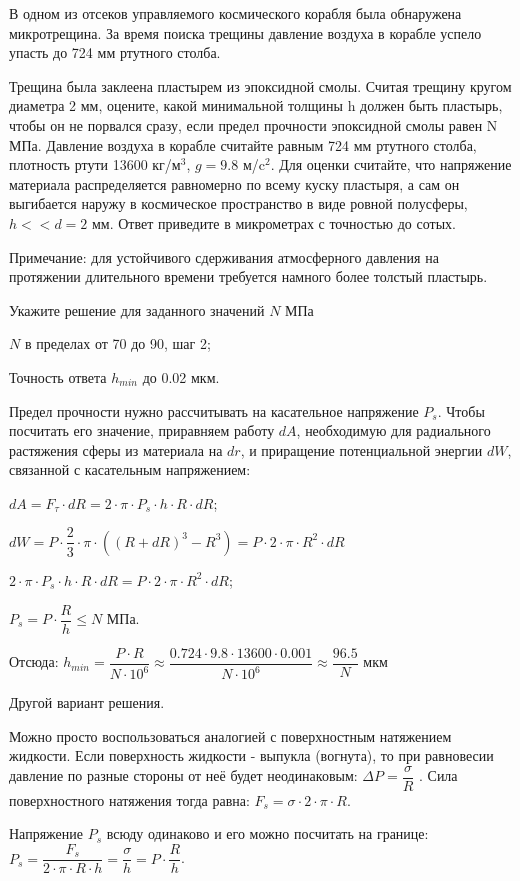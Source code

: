 
В одном из отсеков управляемого космического
корабля была обнаружена микротрещина. За время поиска трещины давление воздуха в
корабле успело упасть до 724 мм ртутного столба. 

Трещина была заклеена
пластырем из эпоксидной смолы. Считая трещину кругом диаметра 2 мм, оцените,
какой минимальной толщины h
должен быть пластырь, чтобы он не порвался сразу, если предел прочности
эпоксидной смолы равен N МПа. Давление воздуха в корабле считайте равным 724 мм ртутного столба, плотность ртути 13600 кг/м$^3$, $g=9.8$ м/c$^2$. Для оценки считайте, что напряжение материала распределяется равномерно по всему
куску пластыря, а сам он выгибается наружу в космическое пространство в виде
ровной полусферы,  $h << d = 2$ мм. Ответ приведите в микрометрах с точностью до сотых.

Примечание:
для устойчивого сдерживания атмосферного давления на протяжении длительного
времени требуется намного более толстый пластырь.

Укажите решение для заданного значений $N$ МПа

\paramSection

$N$ в пределах от 70 до 90, шаг 2;         

Точность ответа  $h_{min}$  до  0.02 мкм.

\solutionSection

Предел прочности нужно рассчитывать на касательное напряжение $P_s$. Чтобы посчитать его значение, 
приравняем работу $dA$, необходимую для радиального растяжения сферы из материала на $dr$, и приращение 
потенциальной энергии $dW$, связанной с касательным напряжением:

$dA=F_{\tau} \cdot dR=2 \cdot \pi \cdot P_s \cdot h \cdot R \cdot dR$; 

$dW=P \cdot \dfrac{2}{3} \cdot \pi \cdot ((R+dR)^3-R^3 )=P \cdot 2 \cdot \pi \cdot R^2 \cdot dR$ 

$2 \cdot \pi \cdot P_s \cdot h \cdot R \cdot dR=P \cdot 2 \cdot \pi \cdot R^2 \cdot dR$; 

$ P_s=P \cdot \dfrac{R}{h} \leq N$ МПа.  

Отсюда:
$h_{min}=\dfrac{P \cdot R}{N \cdot 10^6} \approx \dfrac{0.724 \cdot 9.8 \cdot 13600 \cdot 0.001}{N \cdot 10^6} \approx \dfrac{96.5}{N}$  мкм

Другой вариант решения.

Можно просто воспользоваться аналогией с поверхностным натяжением жидкости. 
Если поверхность жидкости - выпукла (вогнута), то при равновесии давление по разные стороны от 
неё будет неодинаковым:  $\Delta P= \dfrac{\sigma}{R}$ . Сила поверхностного натяжения тогда равна: 
$F_s= \sigma  \cdot 2 \cdot \pi \cdot R$.

Напряжение $P_s$ всюду одинаково и его можно посчитать на границе:  
$P_s=\dfrac{F_s}{2 \cdot \pi \cdot R \cdot h}= \dfrac{\sigma}{h}=P \cdot \dfrac{R}{h}$.



